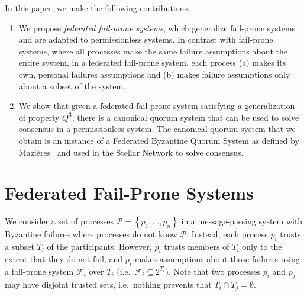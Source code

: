 \documentclass[11pt,letterpaper]{article}
\begin{document}
In this paper, we make the following contributions:
\begin{enumerate}
  \item
    We propose \emph{federated fail-prone systems}, which generalize fail-prone systems and are adapted to permissionless systems.
    In contrast with fail-prone systems, where all processes make the same failure assumptions about the entire system, in a federated fail-prone system, each process (a) makes its own, personal failures assumptions and (b) makes failure assumptions only about a subset of the system.
  \item
    We show that given a federated fail-prone system satisfying a generalization of property $Q^3$, there is a canonical quorum system that can be used to solve consensus in a permissionless system.
    The canonical quorum system that we obtain is an instance of a Federated Byzantine Quorum System as defined by Mazières~\cite{MazieresStellarConsensusProtocol2015} and used in the Stellar Network to solve consensus.
\end{enumerate}


\section{Federated Fail-Prone Systems}
\label{sec:basic}

We consider a set of processes $\mathcal{P}=\left\{p_1,...,p_n\right\}$ in a message-passing system with Byzantine failures where processes do not know $\mathcal{P}$.
Instead, each process $p_i$ trusts a subset $T_i$ of the participants.
However, $p_i$ trusts members of $T_i$ only to the extent that they do not fail, and $p_i$ makes assumptions about those failures using a fail-prone system $\mathcal{F}_i$ over $T_i$ (i.e.\ $\mathcal{F}_i\subseteq 2^{T_i}$).
Note that two processes $p_i$ and $p_j$ may have disjoint trusted sets, i.e.\ nothing prevents that $T_i\cap T_j=\emptyset$.

\end{document}
